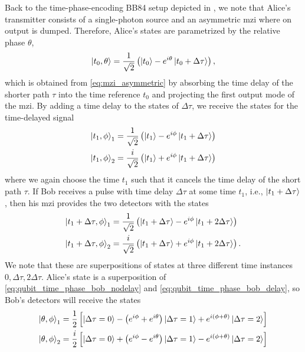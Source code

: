 Back to the time-phase-encoding BB84 setup depicted in , we note that Alice's transmitter consists of a single-photon source and an asymmetric \gls{mzi} where on output is dumped.
Therefore, Alice's states are parametrized by the relative phase $\theta$,
\begin{equation}
	\ket{t_0,\theta}
	=
	\frac{1}{\sqrt{2}}
	\left(
		\ket{t_0}
		-
		e^{i\theta}
		\ket{t_0+\Delta\tau}
	\right)
	,
\end{equation}
which is obtained from \cref{eq:mzi_asymmetric} by absorbing the time delay of the shorter path $\tau$ into the time reference $t_0$ and projecting the first output mode of the \gls{mzi}.
By adding a time delay to the states of $\Delta\tau$, we receive the states for the time-delayed signal
\begin{align}
	\ket{t_1,\phi}_1
	&=
	\frac{1}{\sqrt{2}}
	\left(
		\ket{t_1}
		-
		e^{i\phi}
		\ket{t_1+\Delta\tau}
	\right)
	\\
	\ket{t_1,\phi}_2
	&=
	\frac{i}{\sqrt{2}}
	\left(
		\ket{t_1}
		+
		e^{i\phi}
		\ket{t_1+\Delta\tau}
	\right)
	\label{eq:qubit_time_phase_bob_nodelay}
\end{align}
where we again choose the time $t_1$ such that it cancels the time delay of the short path $\tau$.
If Bob receives a pulse with time delay $\Delta\tau$ at some time $t_1$, i.e., $\ket{t_1+\Delta\tau}$, then his \gls{mzi} provides the two detectors with the states
\begin{align}
	\ket{t_1+\Delta\tau,\phi}_1
	&=
	\frac{1}{\sqrt{2}}
	\left(
		\ket{t_1+\Delta\tau}
		-
		e^{i\phi}
		\ket{t_1+2\Delta\tau}
	\right)
	\\
	\ket{t_1+\Delta\tau,\phi}_2
	&=
	\frac{i}{\sqrt{2}}
	\left(
		\ket{t_1+\Delta\tau}
		+
		e^{i\phi}
		\ket{t_1+2\Delta\tau}
	\right)
	.
	\label{eq:qubit_time_phase_bob_nodelay}
\end{align}
We note that these are superpositions of states at three different time instances $0,\Delta\tau,2\Delta\tau$.
Alice's state is a superposition of \cref{eq:qubit_time_phase_bob_nodelay} and \cref{eq:qubit_time_phase_bob_delay}, so Bob's detectors will receive the states
\begin{align}
	\ket{\theta,\phi}_1
	&=
	\frac{1}{2}
	\left[
		\ket{\Delta\tau=0}
		-
		\left(
			e^{i\phi}
			+
			e^{i\theta}
		\right)
		\ket{\Delta\tau=1}
		+
		e^{i(\phi+\theta)}
		\ket{\Delta\tau=2}
	\right]
	\\
	\ket{\theta,\phi}_2
	&=
	\frac{i}{2}
	\left[
		\ket{\Delta\tau=0}
		+
		\left(
			e^{i\phi}
			-
			e^{i\theta}
		\right)
		\ket{\Delta\tau=1}
		-
		e^{i(\phi+\theta)}
		\ket{\Delta\tau=2}
	\right]
	\label{eq:qubit_time_phase_bob}
\end{align}
